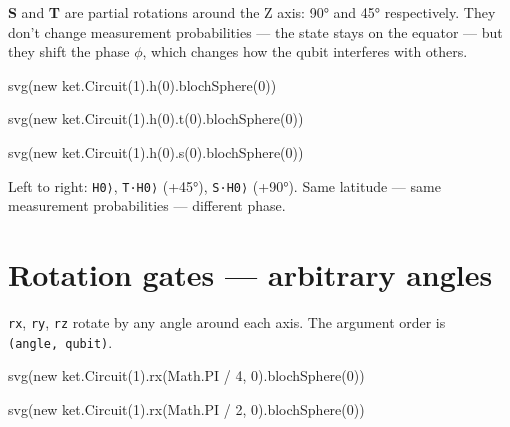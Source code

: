 \documentclass[
  11pt,
  letterpaper,
  oneside]{scrbook}
\newenvironment{Shaded}{\begin{snugshade}}{\end{snugshade}}
\newcommand{\NormalTok}[1]{\textcolor[rgb]{0.00,0.23,0.31}{#1}}
\begin{document}
\textbf{S} and \textbf{T} are partial rotations around the Z axis: 90°
and 45° respectively. They don't change measurement probabilities ---
the state stays on the equator --- but they shift the phase \(\phi\),
which changes how the qubit interferes with others.

\begin{Shaded}
\begin{Highlighting}[]
\NormalTok{svg(new ket.Circuit(1).h(0).blochSphere(0))}
\end{Highlighting}
\end{Shaded}

\begin{Shaded}
\begin{Highlighting}[]
\NormalTok{svg(new ket.Circuit(1).h(0).t(0).blochSphere(0))}
\end{Highlighting}
\end{Shaded}

\begin{Shaded}
\begin{Highlighting}[]
\NormalTok{svg(new ket.Circuit(1).h(0).s(0).blochSphere(0))}
\end{Highlighting}
\end{Shaded}

Left to right: \texttt{H\textbar{}0⟩}, \texttt{T·H\textbar{}0⟩} (+45°),
\texttt{S·H\textbar{}0⟩} (+90°). Same latitude --- same measurement
probabilities --- different phase.

\section{Rotation gates --- arbitrary
angles}\label{rotation-gates-arbitrary-angles}

\texttt{rx}, \texttt{ry}, \texttt{rz} rotate by any angle around each
axis. The argument order is \texttt{(angle,\ qubit)}.

\begin{Shaded}
\begin{Highlighting}[]
\NormalTok{svg(new ket.Circuit(1).rx(Math.PI / 4, 0).blochSphere(0))}
\end{Highlighting}
\end{Shaded}

\begin{Shaded}
\begin{Highlighting}[]
\NormalTok{svg(new ket.Circuit(1).rx(Math.PI / 2, 0).blochSphere(0))}
\end{Highlighting}
\end{Shaded}
\end{document}
